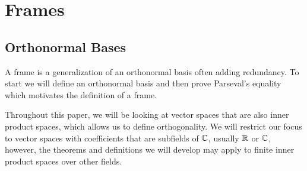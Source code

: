 \section{Frames}
\label{sec:orth_frames}
\subsection{Orthonormal Bases}
\label{ssec:ortho}
A frame is a generalization of an orthonormal basis often adding redundancy. To start we will define an orthonormal basis and then prove Parseval's equality which motivates the definition of a frame.

Throughout this paper, we will be looking at vector spaces that are also inner product spaces, which allows us to define orthogonality. 
We will restrict our focus to vector spaces with coefficients that are subfields of $\mathbb{C}$, usually $\mathbb{R}$ or $\mathbb{C}$, however, the theorems and definitions we will develop may apply to finite inner product spaces over other fields.

